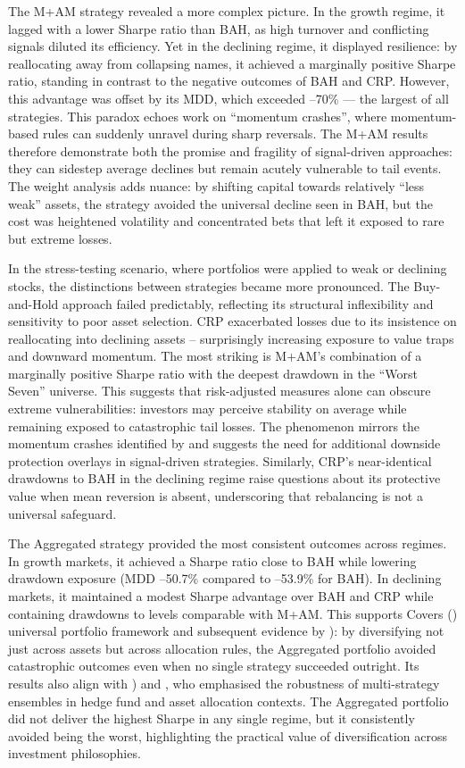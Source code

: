 \documentclass[12pt,a4paper]{report}
\begin{document}
The M+AM strategy revealed a more complex picture. In the growth regime, it lagged with a lower Sharpe ratio than BAH, as high turnover and conflicting signals diluted its efficiency. Yet in the declining regime, it displayed resilience: by reallocating away from collapsing names, it achieved a marginally positive Sharpe ratio, standing in contrast to the negative outcomes of BAH and CRP. However, this advantage was offset by its MDD, which exceeded –70\% — the largest of all strategies. This paradox echoes \citet{Daniel2016} work on “momentum crashes”, where momentum-based rules can suddenly unravel during sharp reversals. The M+AM results therefore demonstrate both the promise and fragility of signal-driven approaches: they can sidestep average declines but remain acutely vulnerable to tail events. The weight analysis adds nuance: by shifting capital towards relatively “less weak” assets, the strategy avoided the universal decline seen in BAH, but the cost was heightened volatility and concentrated bets that left it exposed to rare but extreme losses.

In the stress-testing scenario, where portfolios were applied to weak or declining stocks, the distinctions between strategies became more pronounced. The Buy-and-Hold approach failed predictably, reflecting its structural inflexibility and sensitivity to poor asset selection. CRP exacerbated losses due to its insistence on reallocating into declining assets -- surprisingly increasing exposure to value traps and downward momentum. The most striking is M+AM’s combination of a marginally positive Sharpe ratio with the deepest drawdown in the “Worst Seven” universe. This suggests that risk-adjusted measures alone can obscure extreme vulnerabilities: investors may perceive stability on average while remaining exposed to catastrophic tail losses. The phenomenon mirrors the momentum crashes identified by \citet{Daniel2016} and suggests the need for additional downside protection overlays in signal-driven strategies. Similarly, CRP’s near-identical drawdowns to BAH in the declining regime raise questions about its protective value when mean reversion is absent, underscoring that rebalancing is not a universal safeguard.

The Aggregated strategy provided the most consistent outcomes across regimes. In growth markets, it achieved a Sharpe ratio close to BAH while lowering drawdown exposure (MDD –50.7\% compared to –53.9\% for BAH). In declining markets, it maintained a modest Sharpe advantage over BAH and CRP while containing drawdowns to levels comparable with M+AM. This supports Cover\textquotesingle s (\citeyear{Cover1991}) universal portfolio framework and subsequent evidence by \citet{Cover1996}): by diversifying not just across assets but across allocation rules, the Aggregated portfolio avoided catastrophic outcomes even when no single strategy succeeded outright. Its results also align with \citet{Fung2004}) and \citet{Ilmanen2011}, who emphasised the robustness of multi-strategy ensembles in hedge fund and asset allocation contexts. The Aggregated portfolio did not deliver the highest Sharpe in any single regime, but it consistently avoided being the worst, highlighting the practical value of diversification across investment philosophies.
\end{document}
